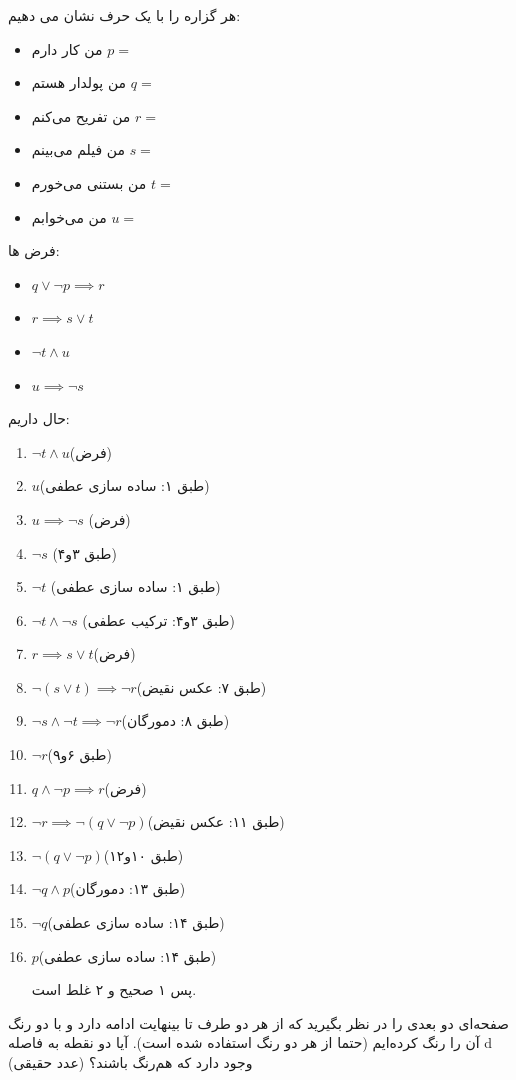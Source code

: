\documentclass[11pt,largemargins]{h2wp}
\begin{document}
هر گزاره را با یک حرف نشان می دهیم:
\begin{itemize}
\item من کار دارم $p= $
\item من پولدار هستم $q= $ 
\item من تفریح می‌کنم $r= $ 
\item من فیلم می‌بینم $s= $ 
\item من بستنی می‌خورم $t= $ 
\item من می‌خوابم $u= $ 
\end{itemize}
فرض ها:
\begin{itemize}
\item $q \lor \neg p\implies r$
\item $r\implies s\lor t$
\item $\neg t \land u$
\item $u \implies \neg s$
\end{itemize}
حال داریم:
\begin{enumerate}
\item $\neg t \land u$(فرض) 
\item $u$(طبق ۱: ساده سازی عطفی)
\item $u \implies \neg s$ (فرض)
\item $\neg s$ (طبق ۳و۴)
\item $\neg t$ (طبق ۱: ساده سازی عطفی)
\item $\neg t \land \neg s$ (طبق ۳و۴: ترکیب عطفی)
\item $r\implies s\lor t$(فرض)
\item $\neg(s\lor t)\implies \neg r$(طبق ۷: عکس نقیض)
\item $\neg s \land \neg t \implies \neg r$(طبق ۸: دمورگان)
\item $\neg r$(طبق ۶و۹)
\item $q \land \neg p\implies r$(فرض)
\item $\neg r \implies \neg(q \lor \neg p)$(طبق ۱۱: عکس نقیض)
\item $\neg(q \lor \neg p)$(طبق ۱۰و۱۲)
\item $\neg q \land p$(طبق ۱۳: دمورگان)
\item $\neg q$(طبق ۱۴: ساده سازی عطفی)
\item $p$(طبق ۱۴: ساده سازی عطفی)

پس ۱ صحیح و ۲ غلط است.
\end{enumerate}



\question

صفحه‌ای دو بعدی را در نظر بگیرید که از هر دو طرف تا بینهایت ادامه دارد و با دو رنگ آن را رنگ کرده‌ایم (حتما از هر دو رنگ استفاده شده است). آیا دو نقطه به فاصله d (عدد حقیقی) وجود دارد که هم‌رنگ باشند؟
\end{document}
